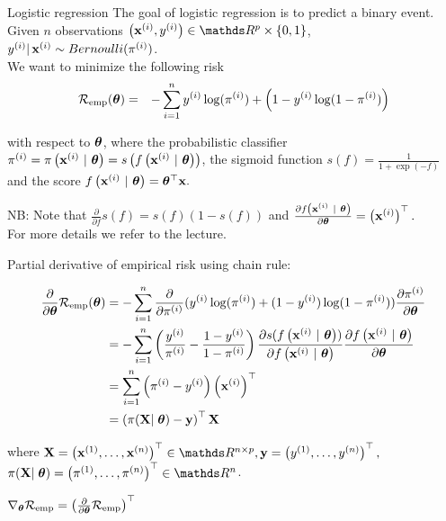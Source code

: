 \documentclass[11pt,compress,t,notes=noshow, xcolor=table]{beamer}
\begin{document}
\begin{vbframe}{Logistic regression}
The goal of logistic regression is to predict a binary event.
Given $n$ observations $\left(\xi, \yi\right) \in \R^p \times \{0, 1\}$,
$y^{(i)} |\, \mathbf{x}^{(i)} \sim Bernoulli(\pi^{(i)})$.\\
\lz
We want to minimize the following risk 
\begin{eqnarray*}
  \mathcal{R}_{\text{emp}}(\bm{\theta})  & = & 
  -\sum^n_{i=1} y^{(i)}\log(\pi^{(i)}) + \left(1-y^{(i)}\log(1-\pi^{(i)})\right)
\end{eqnarray*}

with respect to $\bm{\theta}$, 
where the probabilistic classifier $\pi^{(i)} = \pi\left(\mathbf{x}^{(i)} ~|~ \bm{\theta}\right) = s\left(f\left(\mathbf{x}^{(i)} ~|~ \bm{\theta}\right)\right)$,
the sigmoid function $s(f) = \frac{1}{1 + \exp(-f)}$ and the score $f\left(\mathbf{x}^{(i)} ~|~ \bm{\theta}\right) = \bm{\theta}^\top \mathbf{x}.$\\
\lz

NB: Note that $\frac{\partial}{\partial f} s(f) = s(f)(1-s(f))$ and $\frac{\partial f\left(\mathbf{x}^{(i)} ~|~ \bm{\theta}\right)}{\partial \bm{\theta}} = \left(\mathbf{x}^{(i)}\right)^\top.$\\
\vspace{0.3cm}
For more details we refer to the \href{https://slds-lmu.github.io/i2ml/chapters/11_advriskmin/}{\color{blue}{i2ml}} lecture.

\framebreak
Partial derivative of empirical risk using chain rule:

{\small
\begin{align*}
  \frac{\partial}{\partial\bm{\theta}}\mathcal{R}_{\text{emp}}(\bm{\theta}) 
& =  
 -\sum\limits_{i=1}^n \frac{\partial}{\partial\pi^{(i)} }(y^{(i)}\log(\pi^{(i)})+(1-y^{(i)})\log(1-\pi^{(i)}))\frac{\partial\pi^{(i)}}{\partial \bm{\theta}} \\
& =  
  -\sum\limits_{i=1}^n \left(\frac{y^{(i)}}{\pi^{(i)}} -  \frac{1-y^{(i)}}{1-\pi^{(i)}}\right)\frac{\partial s(f\left(\mathbf{x}^{(i)} ~|~ \bm{\theta}\right))}{\partial  f\left(\mathbf{x}^{(i)} ~|~ \bm{\theta}\right)}\frac{\partial  f\left(\mathbf{x}^{(i)} ~|~ \bm{\theta}\right)}{\partial\bm{\theta}}\\
& = 
  \sum\limits_{i=1}^n \left(\pi^{(i)} - y^{(i)}\right)\left(\mathbf{x}^{(i)}\right)^\top\\
& = 
  \left(\pi(\mathbf{X}\vert\;\bm{\theta}) - \mathbf{y}\right)^\top\mathbf{X}\\
\end{align*}
}

where  $\mathbf{X} = \left(
    \xi[1], \dots, 
    \xi[n]\right)^\top \in \R^{n\times p}, \mathbf{y} = \left(
    \yi[1], \dots,
    \yi[n]
\right)^\top,$ \\ $\pi(\mathbf{X}\vert\;\thetav) = \left(
    \pi^{(1)}, \dots,
    \pi^{(n)}
\right)^\top \in \R^{n}$.

$\nabla_{\bm{\theta}}\mathcal{R}_{\text{emp}} = \left(\frac{\partial}{\partial\bm{\theta}}\mathcal{R}_{\text{emp}}\right)^\top$


\end{vbframe}
\end{document}
